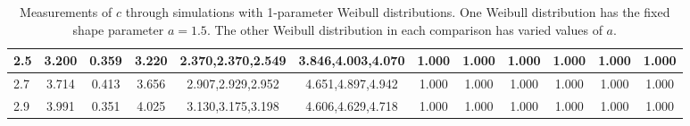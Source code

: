 \begin{table*}[h!]
\begin{center}
\begin{tabular}{| l | c | c | c | c | c | c | c | c | c | c | c |}
2.5 & 3.200 & 0.359 & 3.220 & 2.370,2.370,2.549 & 3.846,4.003,4.070  & 1.000  & 1.000  & 1.000  & 1.000  & 1.000  & 1.000 \\\hline
2.7 & 3.714 & 0.413 & 3.656 & 2.907,2.929,2.952 & 4.651,4.897,4.942  & 1.000  & 1.000  & 1.000  & 1.000  & 1.000  & 1.000 \\\hline
2.9 & 3.991 & 0.351 & 4.025 & 3.130,3.175,3.198 & 4.606,4.629,4.718  & 1.000  & 1.000  & 1.000  & 1.000  & 1.000  & 1.000 \\\hline
\end{tabular}
\caption{Measurements of $c$ through simulations
with 1-parameter Weibull distributions.
One Weibull distribution has the fixed shape parameter $a=1.5$.
The other Weibull distribution in each comparison
has varied values of $a$.}
\end{center}
\end{table*}
